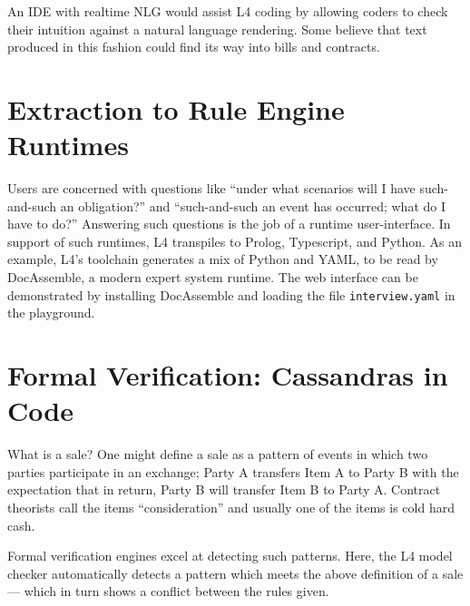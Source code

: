\documentclass{IOS-Book-Article}
\begin{document}
\medskip
\noindent An IDE with realtime NLG would assist L4 coding by allowing coders to check their intuition against a natural language rendering. Some believe that text produced in this fashion could find its way into bills and contracts.

\section{Extraction to Rule Engine Runtimes}

Users are concerned with questions like ``under what scenarios will I have such-and-such an obligation?'' and ``such-and-such an event has occurred; what do I have to do?'' Answering such questions is the job of a runtime user-interface. In support of such runtimes, L4 transpiles to Prolog, Typescript, and Python. As an example, L4's toolchain generates a mix of Python and YAML, to be read by DocAssemble, a modern expert system runtime. The web interface can be demonstrated by installing DocAssemble and loading the file \texttt{interview.yaml} in the playground.

\section{Formal Verification: Cassandras in Code}

What is a sale? One might define a sale as a pattern of events in which two parties participate in an exchange; Party A transfers Item A to Party B with the expectation that in return, Party B will transfer Item B to Party A. Contract theorists call the items ``consideration'' and usually one of the items is cold hard cash.

Formal verification engines excel at detecting such patterns. Here, the L4 model checker automatically detects a pattern which meets the above definition of a sale --- which in turn shows a conflict between the rules given.
\end{document}
